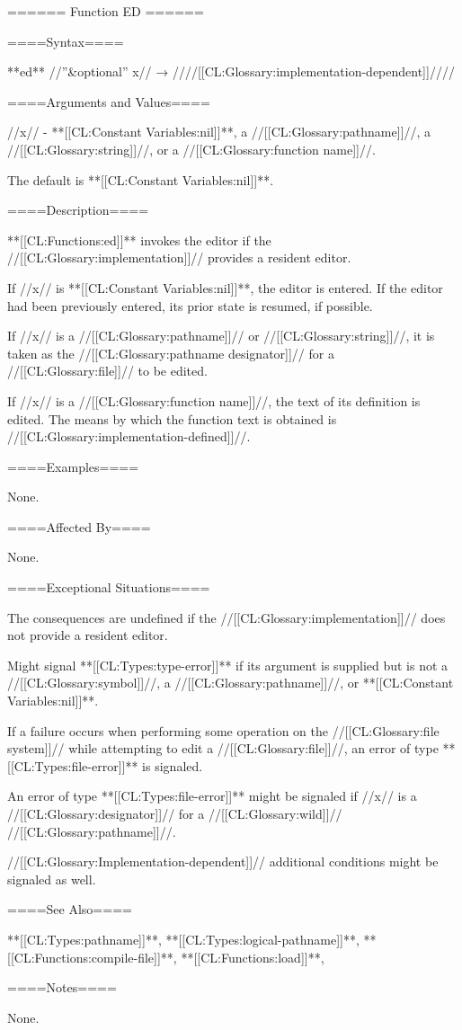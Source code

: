 ====== Function ED ======

====Syntax====

**ed** //''&optional'' x// → ////[[CL:Glossary:implementation-dependent]]////

====Arguments and Values====

//x// - **[[CL:Constant Variables:nil]]**, a //[[CL:Glossary:pathname]]//, a //[[CL:Glossary:string]]//, or a //[[CL:Glossary:function name]]//.

The default is **[[CL:Constant Variables:nil]]**.

====Description====

**[[CL:Functions:ed]]** invokes the editor if the //[[CL:Glossary:implementation]]// provides a resident editor.

If //x// is **[[CL:Constant Variables:nil]]**, the editor is entered. If the editor had been previously entered, its prior state is resumed, if possible.

If //x// is a //[[CL:Glossary:pathname]]// or //[[CL:Glossary:string]]//, it is taken as the //[[CL:Glossary:pathname designator]]// for a //[[CL:Glossary:file]]// to be edited.

If //x// is a //[[CL:Glossary:function name]]//, the text of its definition is edited. The means by which the function text is obtained is //[[CL:Glossary:implementation-defined]]//.

====Examples====

None.

====Affected By====

None.

====Exceptional Situations====

The consequences are undefined if the //[[CL:Glossary:implementation]]// does not provide a resident editor.

Might signal **[[CL:Types:type-error]]** if its argument is supplied but is not a //[[CL:Glossary:symbol]]//, a //[[CL:Glossary:pathname]]//, or **[[CL:Constant Variables:nil]]**.

If a failure occurs when performing some operation on the //[[CL:Glossary:file system]]// while attempting to edit a //[[CL:Glossary:file]]//, an error of type **[[CL:Types:file-error]]** is signaled.

An error of type **[[CL:Types:file-error]]** might be signaled if //x// is a //[[CL:Glossary:designator]]// for a //[[CL:Glossary:wild]]// //[[CL:Glossary:pathname]]//.

//[[CL:Glossary:Implementation-dependent]]// additional conditions might be signaled as well.

====See Also====

**[[CL:Types:pathname]]**, **[[CL:Types:logical-pathname]]**, **[[CL:Functions:compile-file]]**, **[[CL:Functions:load]]**,

{\secref\PathnamesAsFilenames}

====Notes====

None.



     
